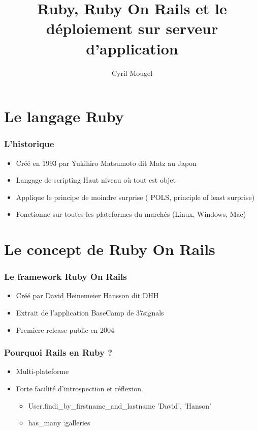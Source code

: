 \documentclass{beamer}
\title{Ruby, Ruby On Rails et le déploiement sur serveur d'application}
\author{Cyril Mougel}
\begin{document}
\section{Le langage Ruby}

\begin{frame}
	\frametitle{L'historique}
	\begin{itemize}
		\item Créé en 1993 par Yukihiro Matsumoto dit \og{}Matz\fg{} au Japon
		\item Langage de scripting Haut niveau où tout est objet
        \item Applique le principe de moindre surprise ( POLS, principle of
                least surprise)
        \item Fonctionne sur toutes les plateformes du marchés (Linux, Windows,
                Mac)
	\end{itemize}
\end{frame}

\section{Le concept de Ruby On Rails}


\begin{frame}
    \frametitle{Le framework Ruby On Rails}
    \begin{itemize}
        \item Créé par David Heinemeier Hansson dit \og{}DHH\fg{}
        \item Extrait de l'application BaseCamp de 37signals
        \item Premiere release public en 2004 
    \end{itemize}
\end{frame}

\begin{frame}
    \frametitle{Pourquoi Rails en Ruby ?}
    \begin{itemize}
        \item Multi-plateforme
        \item Forte facilité d'introspection et réflexion.
            \begin{itemize}
                \item User.findi\_by\_firstname\_and\_lastname 'David', 'Hanson'
                \item has\_many :galleries
            \end{itemize}
    \end{itemize}
\end{frame}
\end{document}

